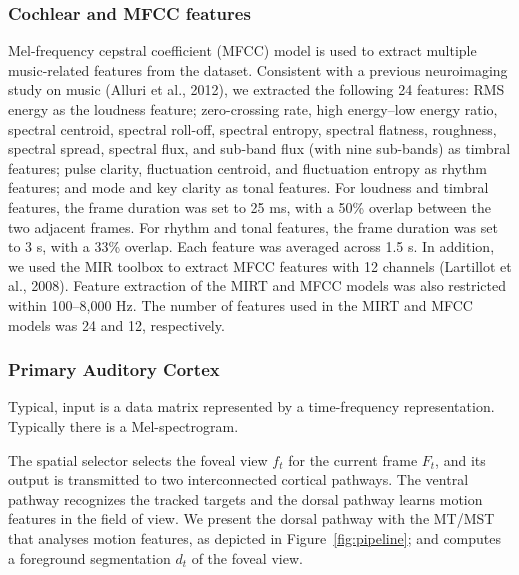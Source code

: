 \documentclass[journal]{IEEEtran}
\begin{document}
\subsubsection{Cochlear and MFCC features}
Mel-frequency cepstral coefficient (MFCC) model is used to extract multiple music-related features from the dataset\cite{rabiner2010theory}.
Consistent with a previous neuroimaging study on music (Alluri et al., 2012), we extracted the following 24 features: 
RMS energy as the loudness feature; 
zero-crossing rate, 
high energy–low energy ratio, 
spectral centroid, 
spectral roll-off, 
spectral entropy, 
spectral flatness, 
roughness, 
spectral spread, 
spectral flux, 
and sub-band flux (with nine sub-bands) as timbral features; 
pulse clarity, 
fluctuation centroid, 
and fluctuation entropy as rhythm features; 
and mode and key clarity as tonal features. 
For loudness and timbral features, the frame duration was set to 25 ms, with a 50\% overlap between the two adjacent frames. 
For rhythm and tonal features, the frame duration was set to 3 s, with a 33\% overlap. 
Each feature was averaged across 1.5 s. 
In addition, we used the MIR toolbox to extract MFCC features with 12 channels (Lartillot et al., 2008). 
Feature extraction of the MIRT and MFCC models was also restricted within 100–8,000 Hz. 
The number of features used in the MIRT and MFCC models was 24 and 12, respectively.


\subsubsection{Primary Auditory Cortex}
Typical, input is a data matrix represented by a time-frequency representation. 
Typically there is a Mel-spectrogram.

The spatial selector selects the foveal view $f_t$ for the current frame $F_t$,
and its output is transmitted to two interconnected cortical pathways.
The ventral pathway recognizes the tracked targets 
and the dorsal pathway learns motion features in the field of view. 
We present the dorsal pathway with the MT/MST that analyses motion features, as depicted in Figure~\ref{fig:pipeline};
and computes a foreground segmentation $d_t$ of the foveal view.
\end{document}
